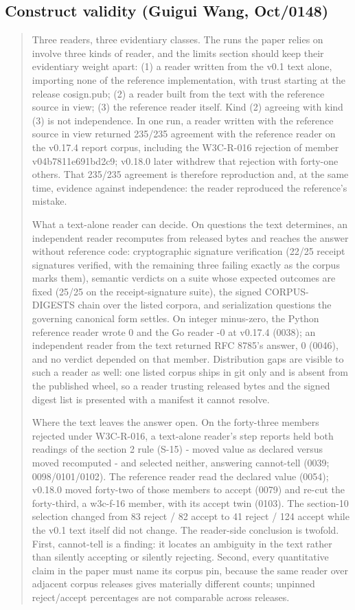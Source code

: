 \subsection{Construct validity (Guigui Wang, Oct/0148)}

\begin{quote}
Three readers, three evidentiary classes. The runs the paper relies on involve three kinds of reader, and the limits section should keep their evidentiary weight apart: (1) a reader written from the v0.1 text alone, importing none of the reference implementation, with trust starting at the release cosign.pub; (2) a reader built from the text with the reference source in view; (3) the reference reader itself. Kind (2) agreeing with kind (3) is not independence. In one run, a reader written with the reference source in view returned 235/235 agreement with the reference reader on the v0.17.4 report corpus, including the W3C-R-016 rejection of member v04b7811e691bd2c9; v0.18.0 later withdrew that rejection with forty-one others. That 235/235 agreement is therefore reproduction and, at the same time, evidence against independence: the reader reproduced the reference's mistake.

What a text-alone reader can decide. On questions the text determines, an independent reader recomputes from released bytes and reaches the answer without reference code: cryptographic signature verification (22/25 receipt signatures verified, with the remaining three failing exactly as the corpus marks them), semantic verdicts on a suite whose expected outcomes are fixed (25/25 on the receipt-signature suite), the signed CORPUS-DIGESTS chain over the listed corpora, and serialization questions the governing canonical form settles. On integer minus-zero, the Python reference reader wrote 0 and the Go reader -0 at v0.17.4 (0038); an independent reader from the text returned RFC 8785's answer, 0 (0046), and no verdict depended on that member. Distribution gaps are visible to such a reader as well: one listed corpus ships in git only and is absent from the published wheel, so a reader trusting released bytes and the signed digest list is presented with a manifest it cannot resolve.

Where the text leaves the answer open. On the forty-three members rejected under W3C-R-016, a text-alone reader's step reports held both readings of the section 2 rule (S-15) - moved value as declared versus moved recomputed - and selected neither, answering cannot-tell (0039; 0098/0101/0102). The reference reader read the declared value (0054); v0.18.0 moved forty-two of those members to accept (0079) and re-cut the forty-third, a w3c-f-16 member, with its accept twin (0103). The section-10 selection changed from 83 reject / 82 accept to 41 reject / 124 accept while the v0.1 text itself did not change. The reader-side conclusion is twofold. First, cannot-tell is a finding: it locates an ambiguity in the text rather than silently accepting or silently rejecting. Second, every quantitative claim in the paper must name its corpus pin, because the same reader over adjacent corpus releases gives materially different counts; unpinned reject/accept percentages are not comparable across releases.


\end{quote}
